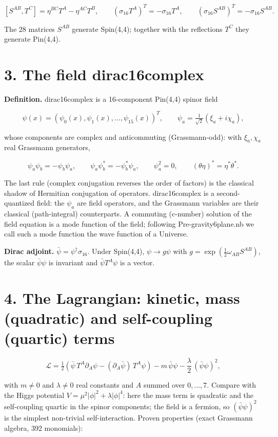 \documentclass[10pt]{article}
\makeatletter
\newcommand\keepnext{\par\nopagebreak\@nobreaktrue\everypar{\@nobreakfalse\everypar{}}}
\makeatother
\begin{document}
\[
[S^{AB}, T^C] = \eta^{BC}T^A - \eta^{AC}T^B, \qquad (\sigma_{16}T^A)^T = -\sigma_{16}T^A, \qquad (\sigma_{16}S^{AB})^T = -\sigma_{16}S^{AB}.
\]

The 28 matrices $S^{AB}$ generate Spin(4,4); together with the reflections $T^C$ they generate Pin(4,4).


\section*{3. The field dirac16complex}

\textbf{Definition.} dirac16complex is a 16-component Pin(4,4) spinor field\keepnext


\[
\psi(x) = (\psi_0(x), \psi_1(x), \dots, \psi_{15}(x))^T, \qquad \psi_a = \tfrac{1}{\sqrt2}(\xi_a + i\chi_a),
\]

whose components are complex and anticommuting (Grassmann-odd): with $\xi_a, \chi_a$ real Grassmann generators,\keepnext


\[
\psi_a\psi_b = -\psi_b\psi_a, \qquad \psi_a\psi_b^{*} = -\psi_b^{*}\psi_a, \qquad \psi_a^2 = 0, \qquad (\theta\eta)^{*} = \eta^{*}\theta^{*}.
\]

The last rule (complex conjugation reverses the order of factors) is the classical shadow of Hermitian conjugation of operators. dirac16complex is a second-quantized field: the $\psi_a$ are field operators, and the Grassmann variables are their classical (path-integral) counterparts. A commuting (c-number) solution of the field equation is a mode function of the field; following Pre-gravity6plane.nb we call such a mode function the wave function of a Universe.


\textbf{Dirac adjoint.} $\bar\psi = \psi^\dagger\sigma_{16}$. Under Spin(4,4), $\psi \to g\psi$ with $g = \exp(\tfrac12\omega_{AB}S^{AB})$, the scalar $\bar\psi\psi$ is invariant and $\bar\psi T^A\psi$ is a vector.


\section*{4. The Lagrangian: kinetic, mass (quadratic) and self-coupling (quartic) terms}

\[
\mathcal L = \tfrac12\left(\bar\psi\,T^A\partial_A\psi - (\partial_A\bar\psi)\,T^A\psi\right) - m\,\bar\psi\psi - \frac{\lambda}{2}\,(\bar\psi\psi)^2 ,
\]

with $m \neq 0$ and $\lambda \neq 0$ real constants and $A$ summed over $0,\dots,7$. Compare with the Higgs potential $V = \mu^2\lvert\phi\rvert^2 + \lambda\lvert\phi\rvert^4$: here the mass term is quadratic and the self-coupling quartic in the spinor components; the field is a fermion, so $(\bar\psi\psi)^2$ is the simplest non-trivial self-interaction. Proven properties (exact Grassmann algebra, 392 monomials):\keepnext
\end{document}
